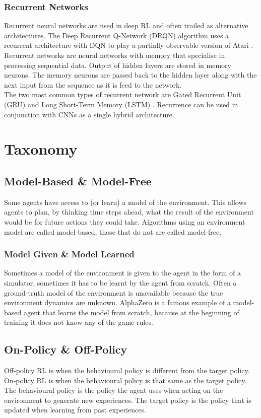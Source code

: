\documentclass[10pt,journal,compsoc]{IEEEtran}
\begin{document}
\subsubsection{Recurrent Networks}
Recurrent neural networks are used in deep RL and often trailed as alternative architectures. The Deep Recurrent Q-Network (DRQN) algorithm uses a recurrent architecture with DQN to play a partially observable version of Atari \cite{Haus:DRQN}. 
\\
Recurrent networks are neural networks with memory that specialise in processing sequential data. Output of hidden layers are stored in memory neurons. The memory neurons are passed back to the hidden layer along with the next input from the sequence as it is feed to the network.
\\
The two most common types of recurrent network are Gated Recurrent Unit (GRU) \cite{chung2014empirical} and Long Short-Term Memory (LSTM) \cite{chung2014empirical}. Recurrence can be used in conjunction with CNNs as a single hybrid architecture.

\section{Taxonomy}
\subsection{Model-Based \& Model-Free}
Some agents have access to (or learn) a model of the environment. This allows agents to plan, by thinking time steps ahead, what the result of the environment would be for future actions they could take. Algorithms using an environment model are called model-based, those that do not are called model-free.
\subsubsection{Model Given \& Model Learned}
Sometimes a model of the environment is given to the agent in the form of a simulator, sometimes it has to be learnt by the agent from scratch. Often a ground-truth model of the environment is unavailable because the true environment dynamics are unknown.  AlphaZero \cite{Silver:AlphaZero} is a famous example of a model-based agent that learns the model from scratch, because at the beginning of training it does not know any of the game rules.
\subsection{On-Policy \& Off-Policy}
Off-policy RL is when the behavioural policy is different from the target policy. On-policy RL is when the behavioural policy is that same as the target policy. The behavioural policy is the policy the agent uses when acting on the environment to generate new experiences. The target policy is the policy that is updated when learning from past experiences.
\end{document}
